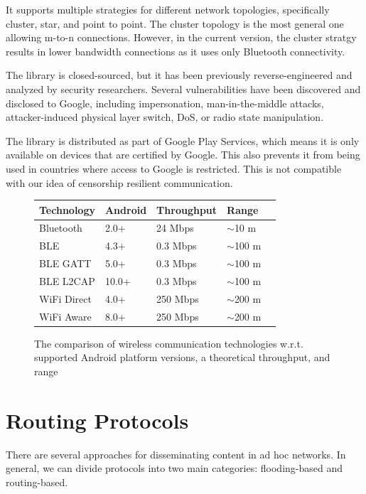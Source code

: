 \documentclass[conference,compsoc]{IEEEtran}
\begin{document}
It supports multiple strategies for different network topologies, specifically cluster, star, and point to point. The cluster topology is the most general one allowing m-to-n connections. However, in the current version, the cluster stratgy results in lower bandwidth connections as it uses only Bluetooth connectivity.

The library is closed-sourced, but it has been previously reverse-engineered and analyzed by security researchers. Several vulnerabilities have been discovered and disclosed to Google, including impersonation, man-in-the-middle attacks, attacker-induced physical layer switch, DoS, or radio state manipulation. \cite{nearbytr}

The library is distributed as part of Google Play Services, which means it is only available on devices that are certified by Google. This also prevents it from being used in countries where access to Google is restricted. This is not compatible with our idea of censorship resilient communication.

\begin{figure}  
  \centering
  \begin{tabular}{ | l | l | l | l | l | }
    \hline
    Technology & Android & Throughput & Range \\
    \hline
    Bluetooth & 2.0+ & 24 Mbps & $\sim$10 m \\
    BLE & 4.3+ & 0.3 Mbps & $\sim$100 m \\
    BLE GATT & 5.0+ & 0.3 Mbps & $\sim$100 m \\
    BLE L2CAP & 10.0+ & 0.3 Mbps & $\sim$100 m \\
    WiFi Direct & 4.0+ & 250 Mbps & $\sim$200 m \\
    WiFi Aware & 8.0+ & 250 Mbps & $\sim$200 m \\
    \hline
  \end{tabular}
  \caption{The comparison of wireless communication technologies w.r.t. supported Android platform versions, a theoretical throughput, and range}
\end{figure}

\section{Routing Protocols}\label{routing}


There are several approaches for disseminating content in ad hoc networks. In general, we can divide protocols into two main categories: flooding-based and routing-based.
\end{document}
